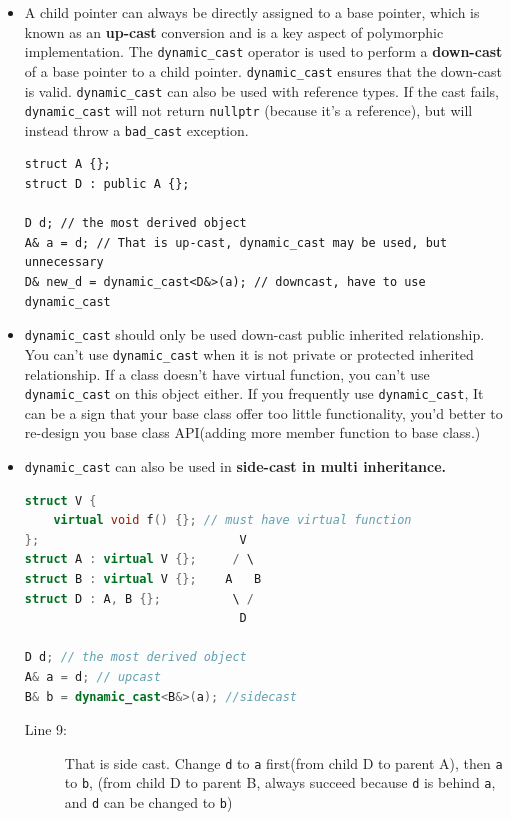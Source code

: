 \documentclass[a4paper,11pt,twoside]{book}
\begin{document}
\begin{itemize}
	\item A child pointer can always be directly assigned to a base pointer, which is known as an \textbf{up-cast} conversion and is a key aspect of polymorphic implementation. The \texttt{dynamic\_cast} operator is used to perform a \textbf{down-cast} of a base pointer to a child pointer. \texttt{dynamic\_cast} ensures that the down-cast is valid. \texttt{dynamic\_cast} can also be used with reference types. If the cast fails, \texttt{dynamic\_cast} will not return \texttt{nullptr} (because it's a reference), but will instead throw a \texttt{bad\_cast} exception.
	
\begin{lstlisting}
struct A {};
struct D : public A {};

D d; // the most derived object
A& a = d; // That is up-cast, dynamic_cast may be used, but unnecessary
D& new_d = dynamic_cast<D&>(a); // downcast, have to use dynamic_cast 
\end{lstlisting}	
	
	\item \texttt{dynamic\_cast} should only be used down-cast public inherited relationship. You can't use \texttt{dynamic\_cast} when it is not private or protected inherited relationship. If a class doesn't have virtual function, you can't use \texttt{dynamic\_cast} on this object either. If you frequently use \texttt{dynamic\_cast}, It can be a sign that your base class offer too little functionality, you'd better to re-design you base class API(adding more member function to base class.)
	
	\item \texttt{dynamic\_cast} can also be used in \textbf{side-cast in multi inheritance. }
\begin{lstlisting}[frame=single, language=c++, mathescape=true]
struct V {
	virtual void f() {}; // must have virtual function
};                            V
struct A : virtual V {};     / \
struct B : virtual V {};    A   B
struct D : A, B {};          \ /
	                          D
	                           
D d; // the most derived object
A& a = d; // upcast 
B& b = dynamic_cast<B&>(a); //sidecast
	\end{lstlisting}

\begin{description}	
	\item[Line 9:] That is side cast. Change \texttt{d} to \texttt{a} first(from child D to parent A), then \texttt{a} to \texttt{b}, (from child D to parent B, always succeed because \texttt{d} is behind \texttt{a}, and \texttt{d} can be changed to \texttt{b})
\end{description}
	

\end{itemize}
\end{document}
